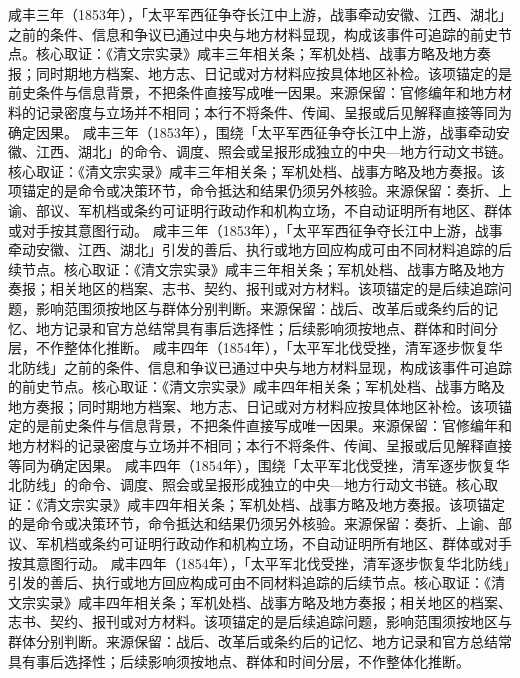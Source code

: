 咸丰三年（1853年），「太平军西征争夺长江中上游，战事牵动安徽、江西、湖北」之前的条件、信息和争议已通过中央与地方材料显现，构成该事件可追踪的前史节点。核心取证：《清文宗实录》咸丰三年相关条；军机处档、战事方略及地方奏报；同时期地方档案、地方志、日记或对方材料应按具体地区补检。该项锚定的是前史条件与信息背景，不把条件直接写成唯一因果。来源保留：官修编年和地方材料的记录密度与立场并不相同；本行不将条件、传闻、呈报或后见解释直接等同为确定因果。
咸丰三年（1853年），围绕「太平军西征争夺长江中上游，战事牵动安徽、江西、湖北」的命令、调度、照会或呈报形成独立的中央—地方行动文书链。核心取证：《清文宗实录》咸丰三年相关条；军机处档、战事方略及地方奏报。该项锚定的是命令或决策环节，命令抵达和结果仍须另外核验。来源保留：奏折、上谕、部议、军机档或条约可证明行政动作和机构立场，不自动证明所有地区、群体或对手按其意图行动。
咸丰三年（1853年），「太平军西征争夺长江中上游，战事牵动安徽、江西、湖北」引发的善后、执行或地方回应构成可由不同材料追踪的后续节点。核心取证：《清文宗实录》咸丰三年相关条；军机处档、战事方略及地方奏报；相关地区的档案、志书、契约、报刊或对方材料。该项锚定的是后续追踪问题，影响范围须按地区与群体分别判断。来源保留：战后、改革后或条约后的记忆、地方记录和官方总结常具有事后选择性；后续影响须按地点、群体和时间分层，不作整体化推断。
咸丰四年（1854年），「太平军北伐受挫，清军逐步恢复华北防线」之前的条件、信息和争议已通过中央与地方材料显现，构成该事件可追踪的前史节点。核心取证：《清文宗实录》咸丰四年相关条；军机处档、战事方略及地方奏报；同时期地方档案、地方志、日记或对方材料应按具体地区补检。该项锚定的是前史条件与信息背景，不把条件直接写成唯一因果。来源保留：官修编年和地方材料的记录密度与立场并不相同；本行不将条件、传闻、呈报或后见解释直接等同为确定因果。
咸丰四年（1854年），围绕「太平军北伐受挫，清军逐步恢复华北防线」的命令、调度、照会或呈报形成独立的中央—地方行动文书链。核心取证：《清文宗实录》咸丰四年相关条；军机处档、战事方略及地方奏报。该项锚定的是命令或决策环节，命令抵达和结果仍须另外核验。来源保留：奏折、上谕、部议、军机档或条约可证明行政动作和机构立场，不自动证明所有地区、群体或对手按其意图行动。
咸丰四年（1854年），「太平军北伐受挫，清军逐步恢复华北防线」引发的善后、执行或地方回应构成可由不同材料追踪的后续节点。核心取证：《清文宗实录》咸丰四年相关条；军机处档、战事方略及地方奏报；相关地区的档案、志书、契约、报刊或对方材料。该项锚定的是后续追踪问题，影响范围须按地区与群体分别判断。来源保留：战后、改革后或条约后的记忆、地方记录和官方总结常具有事后选择性；后续影响须按地点、群体和时间分层，不作整体化推断。
